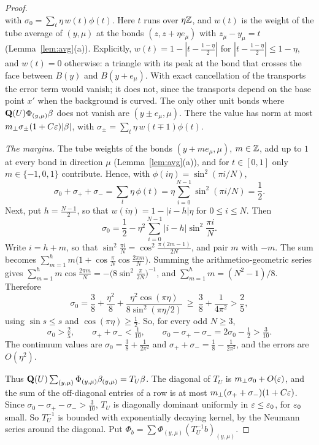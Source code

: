 \begin{proof}
\[\]
with $\sigma_0=\sum_t\eta\,w(t)\phi(t)$. Here $t$ runs over $\eta\mathbb Z$, and $w(t)$ is the weight of the tube average of $(y,\mu)$ at the bonds $(z,z+\eta e_\mu)$ with $z_\mu-y_\mu=t$ (Lemma~\ref{lem:avg}(a)). Explicitly, $w(t)=1-|t-\frac{1-\eta}2|$ for $|t-\frac{1-\eta}2|\le1-\eta$, and $w(t)=0$ otherwise: a triangle with its peak at the bond that crosses the face between $B(y)$ and $B(y+e_\mu)$. With exact cancellation of the transports the error term would vanish; it does not, since the transports depend on the base point $x'$ when the background is curved. The only other unit bonds where $\mathbf Q(U)\Phi_{(y,\mu)}\beta$ does not vanish are $(y\pm e_\mu,\mu)$. There the value has norm at most $m_\perp\sigma_\pm(1+C\varepsilon)|\beta|$, with $\sigma_\pm=\sum_t\eta\,w(t\mp1)\phi(t)$.

\emph{The margins.} The tube weights of the bonds $(y+me_\mu,\mu)$, $m\in\mathbb Z$, add up to $1$ at every bond in direction $\mu$ (Lemma~\ref{lem:avg}(a)), and for $t\in[0,1]$ only $m\in\{-1,0,1\}$ contribute. Hence, with $\phi(i\eta)=\sin^2(\pi i/N)$,
\[
\sigma_0+\sigma_++\sigma_-=\sum_t\eta\,\phi(t)=\eta\sum_{i=0}^{N-1}\sin^2(\pi i/N)=\frac12 .
\]
Next, put $h=\frac{N-1}2$, so that $w(i\eta)=1-|i-h|\eta$ for $0\le i\le N$. Then
\[
\sigma_0=\frac12-\eta^2\sum_{i=0}^{N-1}|i-h|\sin^2\frac{\pi i}N .
\]
Write $i=h+m$, so that $\sin^2\frac{\pi i}N=\cos^2\frac{\pi(2m-1)}{2N}$, and pair $m$ with $-m$. The sum becomes $\sum_{m=1}^hm\big(1+\cos\frac\pi N\cos\frac{2\pi m}N\big)$. Summing the arithmetico-geometric series gives $\sum_{m=1}^hm\cos\frac{2\pi m}N=-\big(8\sin^2\frac\pi{2N}\big)^{-1}$, and $\sum_{m=1}^hm=(N^2-1)/8$. Therefore
\[
\sigma_0=\frac38+\frac{\eta^2}8+\frac{\eta^2\cos(\pi\eta)}{8\sin^2(\pi\eta/2)}\ \ge\ \frac38+\frac1{4\pi^2}>\frac25 ,
\]
using $\sin s\le s$ and $\cos(\pi\eta)\ge\frac12$. So, for every odd $N\ge3$,
\[
\sigma_0>\tfrac25,\qquad\sigma_++\sigma_-<\tfrac1{10},\qquad\sigma_0-\sigma_+-\sigma_-=2\sigma_0-\tfrac12>\tfrac3{10}.
\]
The continuum values are $\sigma_0=\frac38+\frac1{2\pi^2}$ and $\sigma_++\sigma_-=\frac18-\frac1{2\pi^2}$, and the errors are $O(\eta^2)$.

Thus $\mathbf Q(U)\sum_{(y,\mu)}\Phi_{(y,\mu)}\beta_{(y,\mu)}=T_U\beta$. The diagonal of $T_U$ is $m_\perp\sigma_0+O(\varepsilon)$, and the sum of the off-diagonal entries of a row is at most $m_\perp(\sigma_++\sigma_-)(1+C\varepsilon)$. Since $\sigma_0-\sigma_+-\sigma_->\frac3{10}$, $T_U$ is diagonally dominant uniformly in $\varepsilon\le\varepsilon_0$, for $\varepsilon_0$ small. So $T_U^{-1}$ is bounded with exponentially decaying kernel, by the Neumann series around the diagonal. Put $\Phi_b=\sum\Phi_{(y,\mu)}(T_U^{-1}b)_{(y,\mu)}$.


\end{proof}
